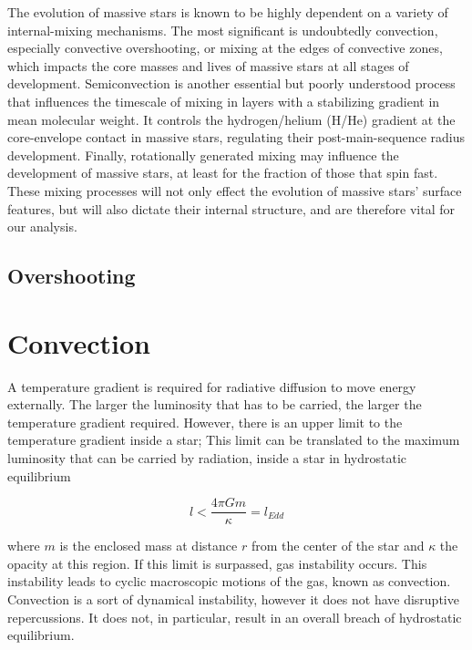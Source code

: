 \documentclass[aps,prb,twocolumn,superscriptaddress,floatfix,longbibliography]{revtex4-2}
\begin{document}
The evolution of massive stars is known to be highly dependent on a variety of internal-mixing mechanisms. The most significant is undoubtedly convection, especially convective overshooting, or mixing at the edges of convective zones, which impacts the core masses and lives of massive stars at all stages of development. Semiconvection is another essential but poorly understood process that influences the timescale of mixing in layers with a stabilizing gradient in mean molecular weight. It controls the hydrogen/helium (H/He) gradient at the core-envelope contact in massive stars, regulating their post-main-sequence radius development. Finally, rotationally generated mixing may influence the development of massive stars, at least for the fraction of those that spin fast. These mixing processes will not only effect the evolution of massive stars' surface features, but will also dictate their internal structure, and are therefore vital for our analysis.

\subsection{Overshooting}




\section{Convection}

A temperature gradient is required for radiative diffusion to move energy externally. The larger the luminosity that has to be carried, the larger the temperature gradient required. However, there is an upper limit to the temperature gradient inside a star; This limit can be translated to the maximum luminosity that can be carried by radiation, inside a star in hydrostatic equilibrium

\begin{equation}\label{eq:eddington_luminosity}
    l < \frac{4 \pi G m}{\kappa} = l_{Edd}
\end{equation}

where $m$ is the enclosed mass at distance $r$ from the center of the star and $\kappa$ the opacity at this region. If this limit is surpassed, gas instability occurs.  This instability leads to cyclic macroscopic motions of the gas, known as convection. Convection is a sort of dynamical instability, however it does not have disruptive repercussions. It does not, in particular, result in an overall breach of hydrostatic equilibrium.
\end{document}
